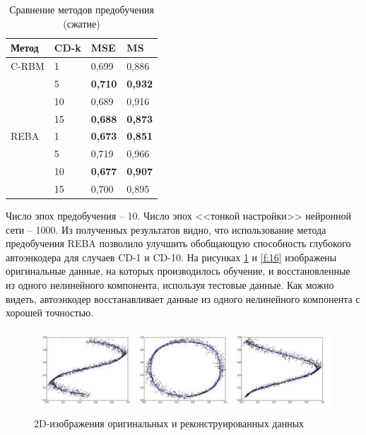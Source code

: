 			\begin{table}[h]
				\caption{Сравнение методов предобучения (сжатие)}								\label{table:data_compressing}
				\centering
				\begin{tabular}{|p{4cm}|p{3cm}|p{2cm}|p{2cm}|}
					\hline
					Метод & CD-k & MSE & MS \\
					\hline
					C-RBM & 1  & 0,699 & 0,886 \\
                        \cline{2-4}
					& 5  & \textbf{0,710} & \textbf{0,932}\\
                        \cline{2-4}							
					&	10 & 0,689 & 0,916\\
					\cline{2-4}
                        &	15 & \textbf{0,688} & \textbf{0,873}\\ \hline
					REBA& 1  & \textbf{0,673} & \textbf{0,851}\\
                        \cline{2-4}
					& 5  & 0,719 & 0,966\\
                        \cline{2-4}
					&	10 & \textbf{0,677} & \textbf{0,907}\\
                        \cline{2-4}
					&	15 & 0,700 & 0,895 \\						
					\hline
				\end{tabular}			
			\end{table}	

Число эпох предобучения -- 10. Число эпох <<тонкой настройки>> нейронной сети -- 1000. Из полученных результатов видно, что использование метода предобучения REBA позволило улучшить обобщающую способность глубокого автоэнкодера для случаев CD-1 и CD-10. На рисунках \ref{f:15} и \ref{f:16} изображены оригинальные данные, на которых производилось обучение, и восстановленные из одного нелинейного компонента, используя тестовые данные. Как можно видеть, автоэнкодер восстанавливает данные из одного нелинейного компонента с хорошей точностью.

\begin{figure}[h]
	\begin{center}
		\includegraphics[width=160mm]{man-source/images/ch3/pic3-6.pdf}
		\caption{2D-изображения оригинальных и реконструированных данных}				
		\label{f:15}
	\end{center}
\end{figure}

